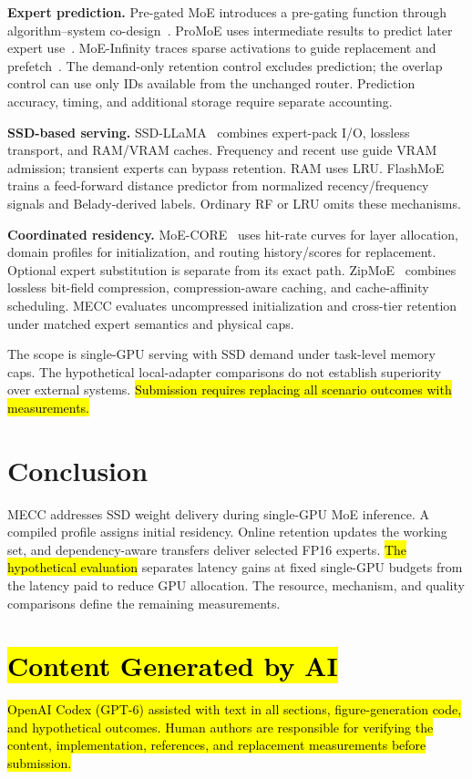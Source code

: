 \documentclass[conference,9pt,letterpaper]{IEEEtran}
\newcommand{\draftnote}[1]{{\sethlcolor{DraftYellow}\hl{#1}}}
\newcommand{\ainote}[1]{{\sethlcolor{AIBlue}\hl{#1}}}
\newcommand{\mecc}{\textsc{MECC}}
\begin{document}
\textbf{Expert prediction.} Pre-gated MoE introduces a pre-gating function through algorithm--system co-design~\cite{pregated}. ProMoE uses intermediate results to predict later expert use~\cite{promoe}. MoE-Infinity traces sparse activations to guide replacement and prefetch~\cite{moeinfinity}. The demand-only retention control excludes prediction; the overlap control can use only IDs available from the unchanged router. Prediction accuracy, timing, and additional storage require separate accounting.

\textbf{SSD-based serving.} SSD-LLaMA~\cite{ssdllama} combines expert-pack I/O, lossless transport, and RAM/VRAM caches. Frequency and recent use guide VRAM admission; transient experts can bypass retention. RAM uses LRU. FlashMoE~\cite{flashmoe} trains a feed-forward distance predictor from normalized recency/frequency signals and Belady-derived labels. Ordinary RF or LRU omits these mechanisms.

\textbf{Coordinated residency.} MoE-CORE~\cite{core} uses hit-rate curves for layer allocation, domain profiles for initialization, and routing history/scores for replacement. Optional expert substitution is separate from its exact path. ZipMoE~\cite{zipmoe} combines lossless bit-field compression, compression-aware caching, and cache-affinity scheduling. \mecc{} evaluates uncompressed initialization and cross-tier retention under matched expert semantics and physical caps.

The scope is single-GPU serving with SSD demand under task-level memory caps. The hypothetical local-adapter comparisons do not establish superiority over external systems. \draftnote{Submission requires replacing all scenario outcomes with measurements.}

\section{Conclusion}
\mecc{} addresses SSD weight delivery during single-GPU MoE inference. A compiled profile assigns initial residency. Online retention updates the working set, and dependency-aware transfers deliver selected FP16 experts. \draftnote{The hypothetical evaluation} separates latency gains at fixed single-GPU budgets from the latency paid to reduce GPU allocation. The resource, mechanism, and quality comparisons define the remaining measurements.

\section*{\ainote{Content Generated by AI}}
\ainote{OpenAI Codex (GPT-6) assisted with text in all sections, figure-generation code, and hypothetical outcomes. Human authors are responsible for verifying the content, implementation, references, and replacement measurements before submission.}

\clearpage
\nobalance
{}


\end{document}
